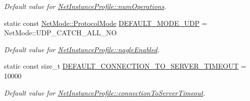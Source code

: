 \begin{DoxyCompactItemize}
\begin{DoxyCompactList}\small\item\em Default value for \hyperlink{class_net_instance_profile_acfc20340749f35543345f8b6c00fef4a}{NetInstanceProfile::numOperations}. \item\end{DoxyCompactList}\item 
\hypertarget{class_net_instance_profile_a247c5f6aeb339edcb8f01a66a592bf3c}{
static const \hyperlink{class_net_mode_a43cfa55ee6a4db66a8d7d6c27f766964}{NetMode::ProtocolMode} \hyperlink{class_net_instance_profile_a247c5f6aeb339edcb8f01a66a592bf3c}{DEFAULT\_\-MODE\_\-UDP} = NetMode::UDP\_\-CATCH\_\-ALL\_\-NO}
\label{class_net_instance_profile_a247c5f6aeb339edcb8f01a66a592bf3c}

\begin{DoxyCompactList}\small\item\em Default value for \hyperlink{class_net_instance_profile_a959f0b77c0e19d4f425c5c36b601ec8c}{NetInstanceProfile::nagleEnabled}. \item\end{DoxyCompactList}\item 
\hypertarget{class_net_instance_profile_a650e1a57d7229fab6a4a9295a8145f79}{
static const size\_\-t \hyperlink{class_net_instance_profile_a650e1a57d7229fab6a4a9295a8145f79}{DEFAULT\_\-CONNECTION\_\-TO\_\-SERVER\_\-TIMEOUT} = 10000}
\label{class_net_instance_profile_a650e1a57d7229fab6a4a9295a8145f79}

\begin{DoxyCompactList}\small\item\em Default value for \hyperlink{class_net_instance_profile_aa9aa810da463cdab017ab864515527c9}{NetInstanceProfile::connectionToServerTimeout}. \item\end{DoxyCompactList}\end{DoxyCompactItemize}
